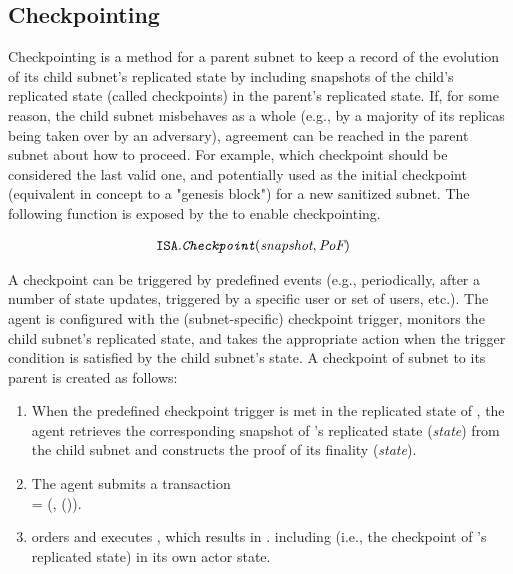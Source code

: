 \subsection{Checkpointing} 
Checkpointing is a method for a parent subnet to keep a record of the evolution of its child subnet's replicated state
by including snapshots of the child's replicated state (called checkpoints) in the parent's replicated state.
If, for some reason, the child subnet misbehaves as a whole (e.g., by a majority of its replicas being taken over by an adversary), 
agreement can be reached in the parent subnet about how to proceed.
For example, which checkpoint should be considered the last valid one,
and potentially used as the initial checkpoint (equivalent in concept to a "genesis block") for a new sanitized subnet.
The following function is exposed by the \sa to enable checkpointing.

\begin{align*}
    \texttt{ISA}.&\textit{\texttt{Checkpoint}}(\textit{snapshot}, \textit{PoF})
\end{align*}

A checkpoint can be triggered by predefined events (e.g.,  periodically, after a number of state updates, triggered by a specific user or set of users, etc.).
The \ipc agent is configured with the (subnet-specific) checkpoint trigger, monitors the child subnet's replicated state,
and takes the appropriate action when the trigger condition is satisfied by the child subnet's state.
A checkpoint of subnet  to its parent  is created as follows:
\begin{enumerate}

    \item When the predefined checkpoint trigger is met in the replicated state of ,
    the \ipc agent retrieves the corresponding snapshot of 's replicated state (\emph{state}) from the child subnet
    and constructs the proof of its finality {\pof}(\emph{state}).

    \item The \ipc agent submits a transaction\\
     = (, {\pof}()).

    \item {} orders and executes , which results in . including 
    (i.e., the checkpoint of 's replicated state) in its own actor state.

\end{enumerate}

